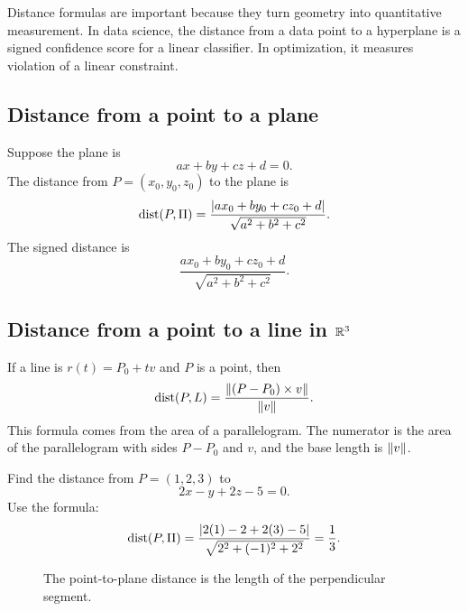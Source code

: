 Distance formulas are important because they turn geometry into quantitative measurement. In data science, the distance from a data point to a hyperplane is a signed confidence score for a linear classifier. In optimization, it measures violation of a linear constraint.

\subsection{Distance from a point to a plane}

Suppose the plane is
\[
  ax+by+cz+d=0.
\]
The distance from $P=(x_0,y_0,z_0)$ to the plane is
\[
  \operatorname{dist}(P,\Pi)=\frac{\left\lvert ax_0+by_0+cz_0+d\right\rvert}{\sqrt{a^2+b^2+c^2}}.
\]
The signed distance is
\[
  \frac{ax_0+by_0+cz_0+d}{\sqrt{a^2+b^2+c^2}}.
\]

\subsection{Distance from a point to a line in $\mathbb{R}^3$}

If a line is $r(t)=P_0+tv$ and $P$ is a point, then
\[
  \operatorname{dist}(P,L)=\frac{\left\lVert (P-P_0)\times v\right\rVert}{\left\lVert v\right\rVert}.
\]
This formula comes from the area of a parallelogram. The numerator is the area of the parallelogram with sides $P-P_0$ and $v$, and the base length is $\left\lVert v\right\rVert$.

\begin{examplebox}[title={Example 4.10: Distance from a point to a plane}]
Find the distance from $P=(1,2,3)$ to
\[
  2x-y+2z-5=0.
\]
Use the formula:
\[
  \operatorname{dist}(P,\Pi)=\frac{\left\lvert 2(1)-2+2(3)-5\right\rvert}{\sqrt{2^2+(-1)^2+2^2}}=\frac{1}{3}.
\]
\end{examplebox}

\begin{figure}[H]
\centering
{}
\caption{The point-to-plane distance is the length of the perpendicular segment.}
\end{figure}

